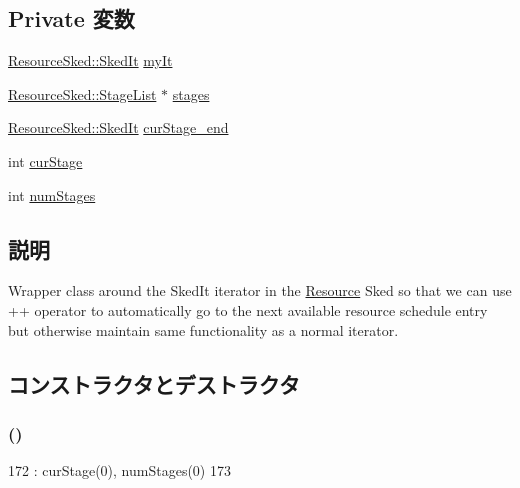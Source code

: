 \subsection*{Private 変数}
\begin{DoxyCompactItemize}
\item 
\hyperlink{classResourceSked_ab2a9eec675af76477619cacd99ea5225}{ResourceSked::SkedIt} \hyperlink{classRSkedIt_a70c82c6eb922e0385c2541c5858f91f4}{myIt}
\item 
\hyperlink{classstd_1_1vector}{ResourceSked::StageList} $\ast$ \hyperlink{classRSkedIt_a8d03655351f40ef469aa02c41eddd6e8}{stages}
\item 
\hyperlink{classResourceSked_ab2a9eec675af76477619cacd99ea5225}{ResourceSked::SkedIt} \hyperlink{classRSkedIt_a603d9e7d20786833c977a34f54167ffe}{curStage\_\-end}
\item 
int \hyperlink{classRSkedIt_a29dad7ce07901930a4b9f505dbc4b96c}{curStage}
\item 
int \hyperlink{classRSkedIt_aaf4f71ec3fd6f4e154d09cd71c2c331b}{numStages}
\end{DoxyCompactItemize}


\subsection{説明}
Wrapper class around the SkedIt iterator in the \hyperlink{classResource}{Resource} Sked so that we can use ++ operator to automatically go to the next available resource schedule entry but otherwise maintain same functionality as a normal iterator. 

\subsection{コンストラクタとデストラクタ}
\hypertarget{classRSkedIt_acf362f222df60312b3c012b2d924e978}{
\subsubsection[{RSkedIt}]{ ()}}
\label{classRSkedIt_acf362f222df60312b3c012b2d924e978}



\begin{DoxyCode}
172         : curStage(0), numStages(0)
173     { }
\end{DoxyCode}


